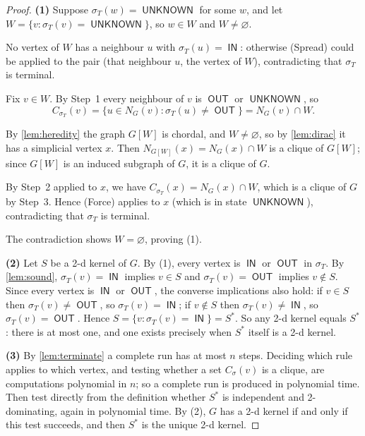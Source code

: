 \documentclass[11pt]{article}
\numberwithin{equation}{section}
\theoremstyle{plain}
\newcommand{\st}{\sigma}                   %
\DeclareMathOperator{\IN}{\mathsf{IN}}
\DeclareMathOperator{\OUT}{\mathsf{OUT}}
\DeclareMathOperator{\UNK}{\mathsf{UNKNOWN}}
\begin{document}
\begin{proof}
\textbf{(1)} Suppose $\st_T(w)=\UNK$ for some $w$, and let $W=\{v:\st_T(v)=\UNK\}$, so
$w\in W$ and $W\neq\varnothing$.

\begin{steps}
\item No vertex of $W$ has a neighbour $u$ with $\st_T(u)=\IN$: otherwise (Spread) could
be applied to the pair (that neighbour $u$, the vertex of $W$), contradicting that
$\st_T$ is terminal.

\item Fix $v\in W$. By Step~1 every neighbour of $v$ is $\OUT$ or $\UNK$, so
\[
  C_{\st_T}(v)=\{u\in N_G(v):\st_T(u)\neq\OUT\}=N_G(v)\cap W .
\]

\item By \cref{lem:heredity} the graph $G[W]$ is chordal, and $W\neq\varnothing$, so by
\cref{lem:dirac} it has a simplicial vertex $x$. Then $N_{G[W]}(x)=N_G(x)\cap W$ is a
clique of $G[W]$; since $G[W]$ is an induced subgraph of $G$, it is a clique of $G$.

\item By Step~2 applied to $x$, we have $C_{\st_T}(x)=N_G(x)\cap W$, which is a clique of
$G$ by Step~3. Hence (Force) applies to $x$ (which is in state $\UNK$), contradicting
that $\st_T$ is terminal.
\end{steps}
The contradiction shows $W=\varnothing$, proving (1).

\textbf{(2)} Let $S$ be a 2-d kernel of $G$. By (1), every vertex is $\IN$ or $\OUT$ in
$\st_T$. By \cref{lem:sound}, $\st_T(v)=\IN$ implies $v\in S$ and $\st_T(v)=\OUT$
implies $v\notin S$. Since every vertex is $\IN$ or $\OUT$, the converse implications
also hold: if $v\in S$ then $\st_T(v)\neq\OUT$, so $\st_T(v)=\IN$; if $v\notin S$ then
$\st_T(v)\neq\IN$, so $\st_T(v)=\OUT$. Hence $S=\{v:\st_T(v)=\IN\}=S^\ast$. So any
2-d kernel equals $S^\ast$: there is at most one, and one exists precisely when $S^\ast$
itself is a 2-d kernel.

\textbf{(3)} By \cref{lem:terminate} a complete run has at most $n$ steps. Deciding
which rule applies to which vertex, and testing whether a set $C_\st(v)$ is a clique,
are computations polynomial in $n$; so a complete run is produced in polynomial time.
Then test directly from the definition whether $S^\ast$ is independent and 2-dominating,
again in polynomial time. By (2), $G$ has a 2-d kernel if and only if this test succeeds,
and then $S^\ast$ is the unique 2-d kernel.
\end{proof}
\end{document}

